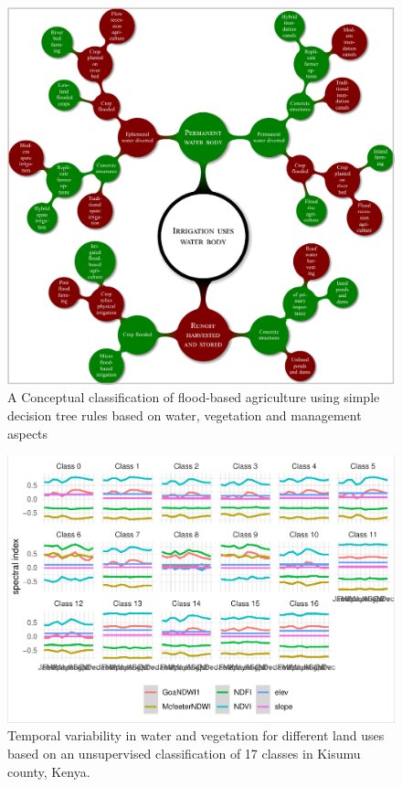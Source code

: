 \documentclass[]{elsarticle} %
\begin{document}
\begin{figure}[!h]

{\centering \includegraphics[width=1\linewidth,]{figures/conceptual-class-1} 

}

\caption{A Conceptual classification of flood-based agriculture using simple decision tree rules based on water, vegetation and management aspects}\label{fig:fig2}
\end{figure}

\begin{figure}[!h]

{\centering \includegraphics[width=1\linewidth,]{figures/Kisumu_unsuper_NDSI} 

}

\caption{Temporal variability in water and vegetation for different land uses based on an unsupervised classification of 17 classes in Kisumu county, Kenya.}\label{fig:fig4}
\end{figure}
\end{document}
